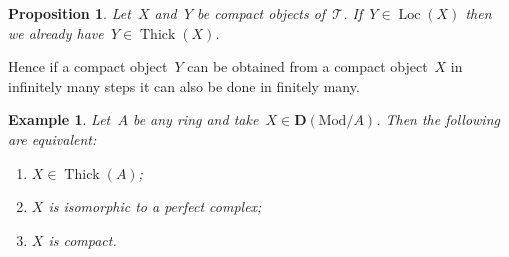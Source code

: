 \documentclass[10pt,a4paper]{article}
\theoremstyle{lecture}
\newtheorem{example}[theorem]{Example}
\newtheorem{proposition}[theorem]{Proposition}
\newcommand\derived{\ensuremath{\mathbf{D}}}
\newcommand\Mod{\ensuremath{\mathrm{Mod}}}
\DeclareMathOperator\Loc{Loc}
\DeclareMathOperator\Thick{Thick}
\begin{document}
\begin{proposition}
  Let~$X$ and~$Y$ be compact objects of~$\mathcal{T}$. If~$Y\in\Loc(X)$ then we already have~$Y\in\Thick(X)$.
\end{proposition}
Hence if a compact object~$Y$ can be obtained from a compact object~$X$ in infinitely many steps it can also be done in finitely many.
\begin{example}
  Let~$A$ be any ring and take~$X\in\derived(\Mod/A)$. Then the following are equivalent:
  \begin{enumerate}
    \item $X\in\Thick(A)$;
    \item $X$ is isomorphic to a perfect complex;
    \item $X$ is compact.
  \end{enumerate}
\end{example}
\end{document}
